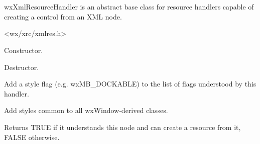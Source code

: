 %
%

\section{}\label{wxxmlresourcehandler}

wxXmlResourceHandler is an abstract base class for resource handlers
capable of creating a control from an XML node.




<wx/xrc/xmlres.h>




\label{wxxmlresourcehandlerwxxmlresourcehandler}


Constructor.


\label{wxxmlresourcehandlerdtor}


Destructor.


\label{wxxmlresourcehandleraddstyle}


Add a style flag (e.g. wxMB\_DOCKABLE) to the list of flags
understood by this handler.


\label{wxxmlresourcehandleraddwindowstyles}


Add styles common to all wxWindow-derived classes.


\label{wxxmlresourcehandlercanhandle}


Returns TRUE if it understands this node and can create
a resource from it, FALSE otherwise.


\label{wxxmlresourcehandlercreatechildren}

